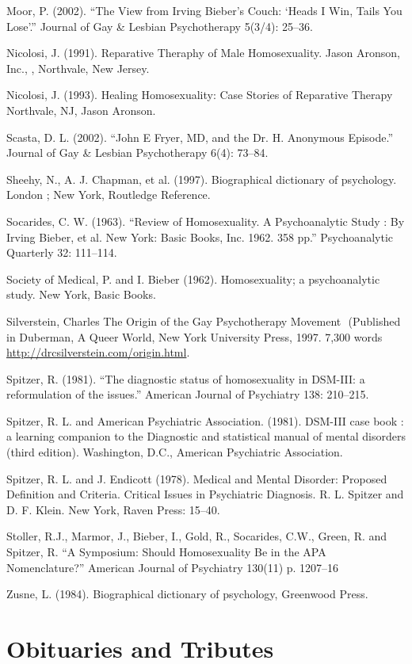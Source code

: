 \begin{refsection}
\begin{appendices}
Moor, P. (2002). ``The View from Irving Bieber's Couch: `Heads I Win, Tails You Lose'.'' Journal of Gay \& Lesbian Psychotherapy 5(3\slash 4): 25--36.

Nicolosi, J. (1991). Reparative Theraphy of Male Homosexuality. Jason Aronson, Inc., , Northvale, New Jersey.

Nicolosi, J. (1993). Healing Homosexuality: Case Stories of Reparative Therapy Northvale, NJ, Jason Aronson.

Scasta, D. L. (2002). ``John E Fryer, MD, and the Dr. H. Anonymous Episode.'' Journal of Gay \& Lesbian Psychotherapy 6(4): 73--84.

Sheehy, N., A. J. Chapman, et al. (1997). Biographical dictionary of psychology. London ; New York, Routledge Reference.

Socarides, C. W. (1963). ``Review of Homosexuality. A Psychoanalytic Study : By Irving Bieber, et al. New York: Basic Books, Inc. 1962. 358 pp.'' Psychoanalytic Quarterly 32: 111--114.

Society of Medical, P. and I. Bieber (1962). Homosexuality; a psychoanalytic study. New York, Basic Books.

Silverstein, Charles The Origin of the Gay Psychotherapy Movement
 (Published in Duberman, A Queer World, New York University Press, 1997. 7,300 words \url{http://drcsilverstein.com/origin.html}.

Spitzer, R. (1981). ``The diagnostic status of homosexuality in DSM-III: a reformulation of the issues.'' American Journal of Psychiatry 138: 210--215.

Spitzer, R. L. and American Psychiatric Association. (1981). DSM-III case book : a learning companion to the Diagnostic and statistical manual of mental disorders (third edition). Washington, D.C., American Psychiatric Association.

Spitzer, R. L. and J. Endicott (1978). Medical and Mental Disorder: Proposed Definition and Criteria. Critical Issues in Psychiatric Diagnosis. R. L. Spitzer and D. F. Klein. New York, Raven Press: 15--40.

Stoller, R.J., Marmor, J., Bieber, I., Gold, R., Socarides, C.W., Green, R. and Spitzer, R. “A Symposium: Should Homosexuality Be in the APA Nomenclature?” American Journal of Psychiatry 130(11) p. 1207--16

Zusne, L. (1984). Biographical dictionary of psychology, Greenwood Press.

\section{Obituaries and Tributes}
\label{obituariesandtributes}


\end{appendices}
\end{refsection}
